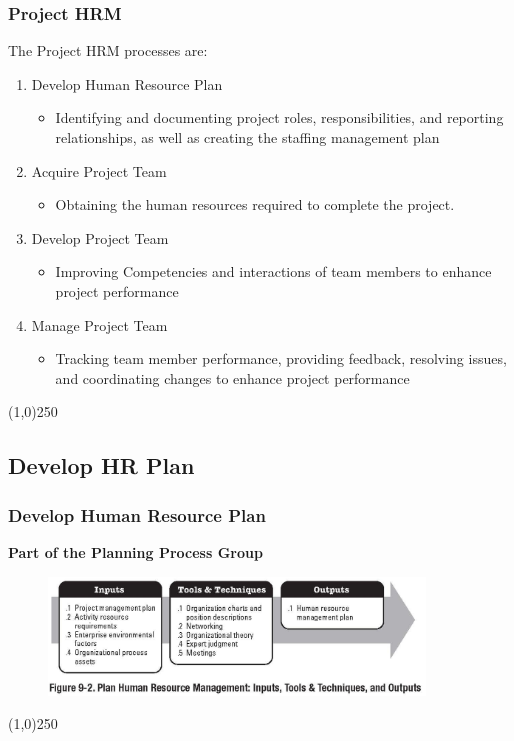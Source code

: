  
\begin{frame}
\frametitle{Project HRM}{The Project HRM processes are:}
\begin{enumerate}
	\item Develop Human Resource Plan
		\begin{itemize}
			\item 		Identifying and documenting project roles, responsibilities, and reporting relationships, as well as creating the staffing management plan
		\end{itemize}
	\item Acquire Project Team
		\begin{itemize}
			\item 		Obtaining the human resources required to complete the project. 
		\end{itemize}
	\item Develop Project Team
		\begin{itemize}
			\item 		Improving Competencies and interactions of team members to enhance project performance
		\end{itemize}
	\item Manage Project Team
		\begin{itemize}
			\item 		Tracking team member performance, providing feedback, resolving issues, and coordinating changes to enhance project performance
		\end{itemize}
\end{enumerate}
\end{frame}\begin{center}\line(1,0){250}\end{center}
 


\subsection{Develop HR Plan}
 
\begin{frame}
\frametitle{Develop Human Resource Plan}
\textbf{Part of the Planning Process Group}
\begin{figure}
	\centering
		\includegraphics[width = 10cm]{images/Fig9-2.jpg}
	\label{fig:9-2}
\end{figure}
\end{frame}\begin{center}\line(1,0){250}\end{center}


